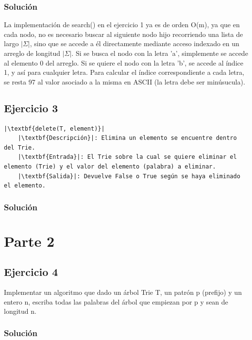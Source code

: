 \documentclass{article}
\begin{document}
\subsubsection*{Solución}
La implementación de search() en el ejercicio 1 ya es de orden O(m), ya que en cada nodo, no es necesario buscar al siguiente nodo hijo recorriendo una lista de largo $|\Sigma|$, sino que se accede a él directamente mediante acceso indexado en un arreglo de longitud $|\Sigma|$. Si se busca el nodo con la letra 'a', simplemente se accede al elemento 0 del arreglo. Si se quiere el nodo con la letra 'b', se accede al índice 1, y así para cualquier letra. Para calcular el índice correspondiente a cada letra, se resta 97 al valor asociado a la misma en ASCII (la letra debe ser minúsucula).


\subsection*{Ejercicio 3}
\begin{lstlisting}
|\textbf{delete(T, element)}|
    |\textbf{Descripción}|: Elimina un elemento se encuentre dentro del Trie.
    |\textbf{Entrada}|: El Trie sobre la cual se quiere eliminar el elemento (Trie) y el valor del elemento (palabra) a eliminar.
    |\textbf{Salida}|: Devuelve False o True según se haya eliminado el elemento.
\end{lstlisting}
\subsubsection*{Solución}


\section*{Parte 2}
\subsection*{Ejercicio 4}
Implementar un algoritmo que dado un árbol Trie T, un patrón p (prefijo) y un entero n, escriba todas las palabras del árbol que empiezan por p y sean de longitud n.
\subsubsection*{Solución}
\end{document}
